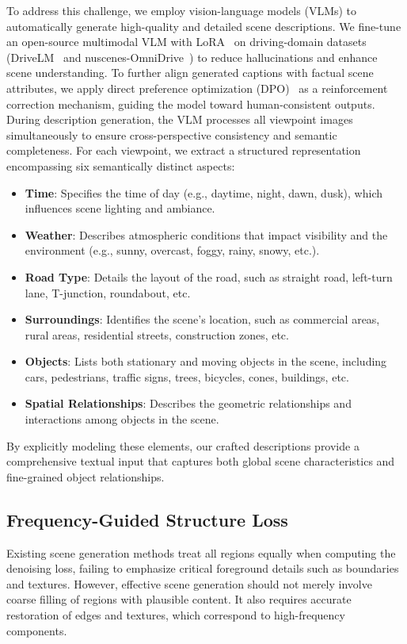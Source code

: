 To address this challenge, we employ vision-language models (VLMs) to automatically generate high-quality and detailed scene descriptions.
We fine-tune an open-source multimodal VLM with LoRA~\cite{hu2022lora} on driving-domain datasets (DriveLM~\cite{sima2024drivelm} and nuscenes-OmniDrive~\cite{wang2025omnidrive}) to reduce hallucinations and enhance scene understanding.
To further align generated captions with factual scene attributes, we apply direct preference optimization (DPO)~\cite{rafailov2023direct} as a reinforcement correction mechanism, guiding the model toward human-consistent outputs. During description generation, the VLM processes all viewpoint images simultaneously to ensure cross-perspective consistency and semantic completeness.
For each viewpoint, we extract a structured representation encompassing six semantically distinct aspects:
\begin{itemize}
	\item \textbf{Time}: Specifies the time of day (e.g., daytime, night, dawn, dusk), which influences scene lighting and ambiance.
	\item \textbf{Weather}: Describes atmospheric conditions that impact visibility and the environment (e.g., sunny, overcast, foggy, rainy, snowy, etc.).
	\item \textbf{Road Type}: Details the layout of the road, such as straight road, left-turn lane, T-junction, roundabout, etc.
	\item \textbf{Surroundings}: Identifies the scene's location, such as commercial areas, rural areas, residential streets, construction zones, etc.
	\item \textbf{Objects}: Lists both stationary and moving objects in the scene, including cars, pedestrians, traffic signs, trees, bicycles, cones, buildings, etc.
	\item \textbf{Spatial Relationships}: Describes the geometric relationships and interactions among objects in the scene.
\end{itemize}

By explicitly modeling these elements, our crafted descriptions provide a comprehensive textual input that captures both global scene characteristics and fine-grained object relationships. 



\subsection{Frequency-Guided Structure Loss}
Existing scene generation methods treat all regions equally when computing the denoising loss, failing to emphasize critical foreground details such as boundaries and textures. However, effective scene generation should not merely involve coarse filling of regions with plausible content. It also requires accurate restoration of edges and textures, which correspond to high-frequency components.

